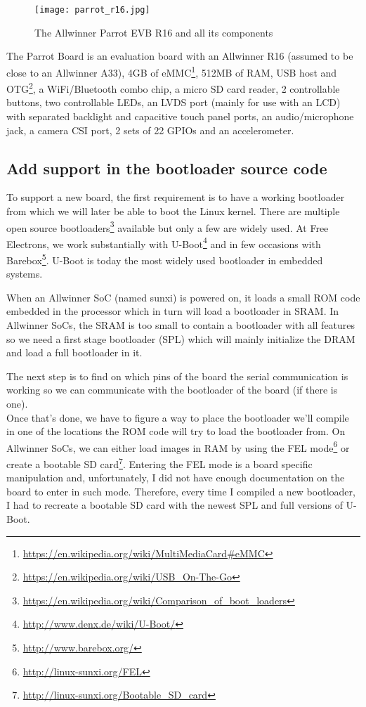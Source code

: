 \begin{figure}[H]
  \texttt{[image: parrot\_r16.jpg]}
  \caption{The Allwinner Parrot EVB R16 and all its components}
\end{figure}

The Parrot Board is an evaluation board with an Allwinner R16 (assumed to be close to an Allwinner A33), 4GB of eMMC\footnote{\url{https://en.wikipedia.org/wiki/MultiMediaCard\#eMMC}}, 512MB of RAM, USB host and OTG\footnote{\url{https://en.wikipedia.org/wiki/USB\_On-The-Go}}, a WiFi/Bluetooth combo chip, a micro SD card reader, 2 controllable buttons, two controllable LEDs, an LVDS port (mainly for use with an LCD) with separated backlight and capacitive touch panel ports, an audio/microphone jack, a camera CSI port, 2 sets of 22 GPIOs and an accelerometer.

\subsection{Add support in the bootloader source code}
To support a new board, the first requirement is to have a working bootloader from which we will later be able to boot the Linux kernel. There are multiple open source bootloaders\footnote{\url{https://en.wikipedia.org/wiki/Comparison\_of\_boot\_loaders}} available but only a few are widely used. At Free Electrons, we work substantially with U-Boot\footnote{\url{http://www.denx.de/wiki/U-Boot/}} and in few occasions with Barebox\footnote{\url{http://www.barebox.org/}}. U-Boot is today the most widely used bootloader in embedded systems.

When an Allwinner SoC (named sunxi) is powered on, it loads a small ROM code embedded in the processor which in turn will load a bootloader in SRAM. In Allwinner SoCs, the SRAM is too small to contain a bootloader with all features so we need a first stage bootloader (SPL) which will mainly initialize the DRAM and load a full bootloader in it.

The next step is to find on which pins of the board the serial communication is working so we can communicate with the bootloader of the board (if there is one).\\
Once that's done, we have to figure a way to place the bootloader we'll compile in one of the locations the ROM code will try to load the bootloader from. On Allwinner SoCs, we can either load images in RAM by using the FEL mode\footnote{\url{http://linux-sunxi.org/FEL}} or create a bootable SD card\footnote{\url{http://linux-sunxi.org/Bootable\_SD\_card}}. Entering the FEL mode is a board specific manipulation and, unfortunately, I did not have enough documentation on the board to enter in such mode. Therefore, every time I compiled a new bootloader, I had to recreate a bootable SD card with the newest SPL and full versions of U-Boot.

